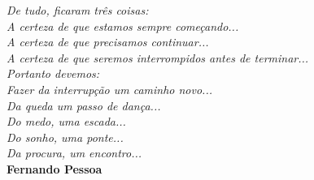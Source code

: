 \begin{epigrafe}
	\vspace*{\fill}
	\begin{flushright}
		\textit{De tudo, ficaram três coisas:\\ \smallskip 
			A certeza de que estamos sempre começando...\\ \smallskip 
			A certeza de que precisamos continuar...\\\smallskip 
			A certeza de que seremos interrompidos antes de terminar...\\\medskip 
			Portanto devemos:\\\smallskip 
			Fazer da interrupção um caminho novo...\\\smallskip 
			Da queda um passo de dança...\\\smallskip 
			Do medo, uma escada...\\\smallskip 
			Do sonho, uma ponte...\\\smallskip 
			Da procura, um encontro...\\ }
		\textbf{Fernando Pessoa}
	\end{flushright}
\end{epigrafe}
